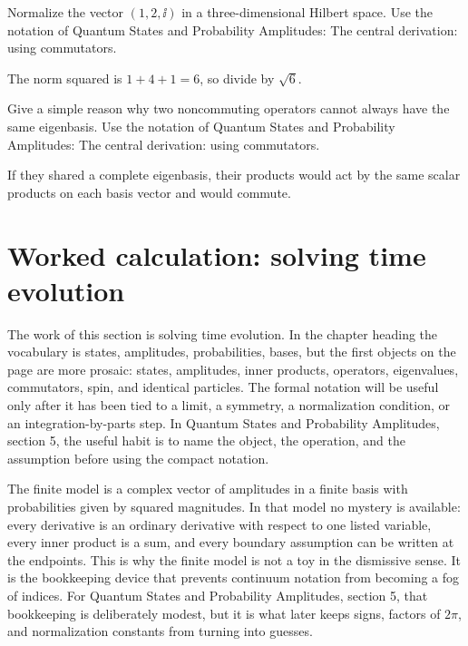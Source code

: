 \begin{exercise}
Normalize the vector \((1,2,\ii)\) in a three-dimensional Hilbert space.  Use the notation of Quantum States and Probability Amplitudes: The central derivation: using commutators.
\begin{answer}
The norm squared is \(1+4+1=6\), so divide by \(\sqrt6\).
\end{answer}
\end{exercise}

\begin{exercise}
Give a simple reason why two noncommuting operators cannot always have the same eigenbasis.  Use the notation of Quantum States and Probability Amplitudes: The central derivation: using commutators.
\begin{answer}
If they shared a complete eigenbasis, their products would act by the same scalar products on each basis vector and would commute.
\end{answer}
\end{exercise}



\section{Worked calculation: solving time evolution}

The work of this section is solving time evolution.  In the chapter heading the vocabulary is states, amplitudes, probabilities, bases, but the first objects on the page are more prosaic: states, amplitudes, inner products, operators, eigenvalues, commutators, spin, and identical particles.  The formal notation will be useful only after it has been tied to a limit, a symmetry, a normalization condition, or an integration-by-parts step.  In Quantum States and Probability Amplitudes, section 5, the useful habit is to name the object, the operation, and the assumption before using the compact notation.

The finite model is a complex vector of amplitudes in a finite basis with probabilities given by squared magnitudes.  In that model no mystery is available: every derivative is an ordinary derivative with respect to one listed variable, every inner product is a sum, and every boundary assumption can be written at the endpoints.  This is why the finite model is not a toy in the dismissive sense.  It is the bookkeeping device that prevents continuum notation from becoming a fog of indices.  For Quantum States and Probability Amplitudes, section 5, that bookkeeping is deliberately modest, but it is what later keeps signs, factors of \(2\pi\), and normalization constants from turning into guesses.

